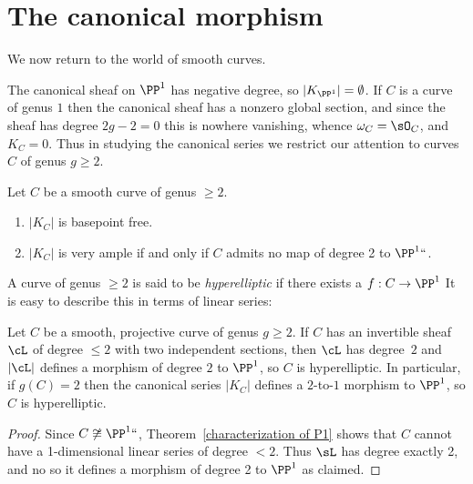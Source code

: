 \section{The canonical morphism}

We now return to the world of smooth curves.
%

 The canonical sheaf on $\PP^1$ has negative degree, so $|K_{\PP^1}| = \emptyset$. If $C$ is a curve
 of genus $1$ then the canonical sheaf     has a nonzero global section, and since the sheaf has degree $2g-2=0$ this is nowhere vanishing, whence
 $\omega_C = \sO_C$, and $K_C = 0$. Thus in studying the canonical series we restrict our attention to curves $C$ of genus $g\geq 2$. 
 
 \begin{theorem}\label{canonical series is very ample} Let $C$ be a smooth curve of genus $\geq 2$.
\begin{enumerate}
 \item $|K_C|$ is basepoint free.
 \item $|K_C|$ is very ample if and only if $C$ admits no map of degree 2 to $\PP^1` `$.
\end{enumerate}
\end{theorem}

A curve of genus $\geq 2$
is said to be \emph{hyperelliptic} if there exists a 
$f: C \to \PP^1$ 
\begingroup\def\marginpar#1{}%
\endgroup
{}%
%
It is easy to describe this in terms of linear series:

\begin{lemma}\label{deg 2 morphism}
Let $C$ be a smooth, projective curve of genus $g\geq 2$. If $C$ has an invertible sheaf $\cL$ of degree $\leq 2$ with two independent sections, then $\cL$ has degree~$2$ and
$|\cL|$ defines a morphism of degree $2$ to $\PP^{1}$, so $C$ is
hyperelliptic. In particular, if $g(C) = 2$ then the canonical series
$|K_{C}|$ defines a $2$-to-$1$ morphism to $\PP^{1}$, so $C$ is
hyperelliptic.
\end{lemma}

\begin{proof}
Since $C \not\cong \PP^1` `$,  Theorem~\ref{characterization of P1} shows that $C$ cannot have a 1-dimensional linear series
of degree $< 2$. Thus $\sL$ has degree exactly 2, and no 
so it defines a morphism of degree 2 to $\PP^1$ as claimed.
\end{proof}

